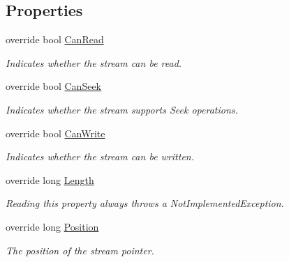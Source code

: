 \subsection*{Properties}
\begin{DoxyCompactItemize}
\item 
override bool \mbox{\hyperlink{class_super_tiled2_unity_1_1_ionic_1_1_b_zip2_1_1_b_zip2_input_stream_a450d6c2cb4227766d939e3d668a624fc}{Can\+Read}}
\begin{DoxyCompactList}\small\item\em Indicates whether the stream can be read. \end{DoxyCompactList}\item 
override bool \mbox{\hyperlink{class_super_tiled2_unity_1_1_ionic_1_1_b_zip2_1_1_b_zip2_input_stream_add8c8707ccfed79325aa15b98e0ea33c}{Can\+Seek}}
\begin{DoxyCompactList}\small\item\em Indicates whether the stream supports Seek operations. \end{DoxyCompactList}\item 
override bool \mbox{\hyperlink{class_super_tiled2_unity_1_1_ionic_1_1_b_zip2_1_1_b_zip2_input_stream_abcb69a881663824540299969b869dc4b}{Can\+Write}}
\begin{DoxyCompactList}\small\item\em Indicates whether the stream can be written. \end{DoxyCompactList}\item 
override long \mbox{\hyperlink{class_super_tiled2_unity_1_1_ionic_1_1_b_zip2_1_1_b_zip2_input_stream_a15869a797d855b7b2df4a26624a1309c}{Length}}
\begin{DoxyCompactList}\small\item\em Reading this property always throws a Not\+Implemented\+Exception. \end{DoxyCompactList}\item 
override long \mbox{\hyperlink{class_super_tiled2_unity_1_1_ionic_1_1_b_zip2_1_1_b_zip2_input_stream_ae767bc8cffc1a81c9098538139ddd1af}{Position}}
\begin{DoxyCompactList}\small\item\em The position of the stream pointer. \end{DoxyCompactList}\end{DoxyCompactItemize}


